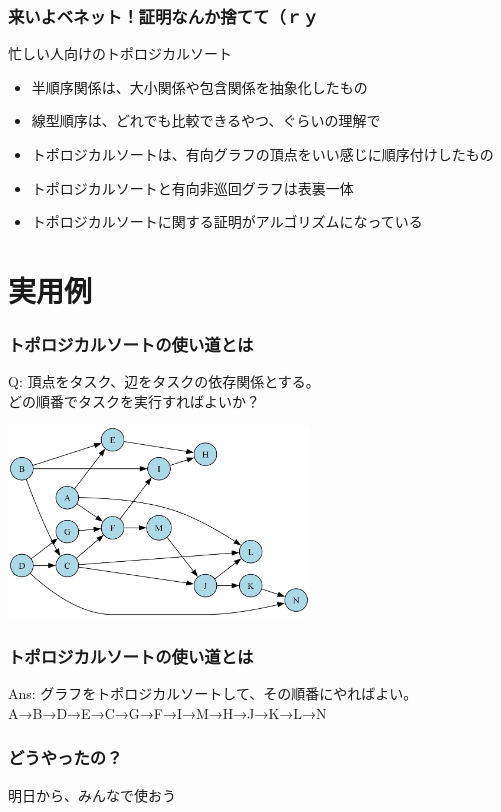 \documentclass[aspectratio=169,dvipdfmx,12pt,notheorems]{beamer}
\theoremstyle{definition}
\begin{document}
\begin{frame}\frametitle{来いよベネット！証明なんか捨てて（ｒｙ}

\begin{block}{忙しい人向けのトポロジカルソート}
\begin{itemize}
\item 半順序関係は、大小関係や包含関係を抽象化したもの
\item 線型順序は、どれでも比較できるやつ、ぐらいの理解で
\item トポロジカルソートは、有向グラフの頂点をいい感じに順序付けしたもの
\item トポロジカルソートと有向非巡回グラフは表裏一体
\item トポロジカルソートに関する証明がアルゴリズムになっている
\end{itemize}
\end{block}

\end{frame}

\section{実用例}

\begin{frame}\frametitle{トポロジカルソートの使い道とは}

\begin{exampleblock}{Q: 頂点をタスク、辺をタスクの依存関係とする。 \\ どの順番でタスクを実行すればよいか？}
\begin{center}
\includegraphics[width=8cm]{complex_dag_example.png}
\end{center}
\end{exampleblock}

\end{frame}

\begin{frame}\frametitle{トポロジカルソートの使い道とは}

\begin{block}{Ans: グラフをトポロジカルソートして、その順番にやればよい。}
A→B→D→E→C→G→F→I→M→H→J→K→L→N
\end{block}

\end{frame}

\begin{frame}\frametitle{どうやったの？}

\begin{center}
\Huge{明日から、みんなで使おう}
\end{center}

\end{frame}
\end{document}
